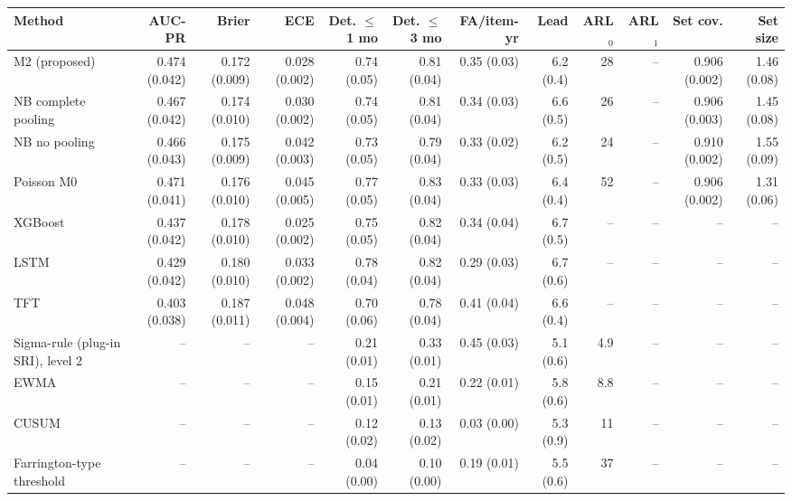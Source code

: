 \documentclass[10pt,a4paper]{article}
\begin{document}
\clearpage
\begin{landscape}
\noindent\begin{minipage}{\linewidth}
\label{tab:S2-stable}
\centering\scriptsize
\begin{tabular}{lrrrrrrrrrrr}
\toprule
Method & AUC-PR & Brier & ECE & Det. $\le$1 mo & Det. $\le$3 mo & FA/item-yr & Lead & ARL$_0$ & ARL$_1$ & Set cov. & Set size \\ \midrule
M2 (proposed) & 0.474 (0.042) & 0.172 (0.009) & 0.028 (0.002) & 0.74 (0.05) & 0.81 (0.04) & 0.35 (0.03) & 6.2 (0.4) & 28 & – & 0.906 (0.002) & 1.46 (0.08) \\
NB complete pooling & 0.467 (0.042) & 0.174 (0.010) & 0.030 (0.002) & 0.74 (0.05) & 0.81 (0.04) & 0.34 (0.03) & 6.6 (0.5) & 26 & – & 0.906 (0.003) & 1.45 (0.08) \\
NB no pooling & 0.466 (0.043) & 0.175 (0.009) & 0.042 (0.003) & 0.73 (0.05) & 0.79 (0.04) & 0.33 (0.02) & 6.2 (0.5) & 24 & – & 0.910 (0.002) & 1.55 (0.09) \\
Poisson M0 & 0.471 (0.041) & 0.176 (0.010) & 0.045 (0.005) & 0.77 (0.05) & 0.83 (0.04) & 0.33 (0.03) & 6.4 (0.4) & 52 & – & 0.906 (0.002) & 1.31 (0.06) \\
XGBoost & 0.437 (0.042) & 0.178 (0.010) & 0.025 (0.002) & 0.75 (0.05) & 0.82 (0.04) & 0.34 (0.04) & 6.7 (0.5) & – & – & – & – \\
LSTM & 0.429 (0.042) & 0.180 (0.010) & 0.033 (0.002) & 0.78 (0.04) & 0.82 (0.04) & 0.29 (0.03) & 6.7 (0.6) & – & – & – & – \\
TFT & 0.403 (0.038) & 0.187 (0.011) & 0.048 (0.004) & 0.70 (0.06) & 0.78 (0.04) & 0.41 (0.04) & 6.6 (0.4) & – & – & – & – \\
Sigma-rule (plug-in SRI), level 2 & – & – & – & 0.21 (0.01) & 0.33 (0.01) & 0.45 (0.03) & 5.1 (0.6) & 4.9 & – & – & – \\
EWMA & – & – & – & 0.15 (0.01) & 0.21 (0.01) & 0.22 (0.01) & 5.8 (0.6) & 8.8 & – & – & – \\
CUSUM & – & – & – & 0.12 (0.02) & 0.13 (0.02) & 0.03 (0.00) & 5.3 (0.9) & 11 & – & – & – \\
Farrington-type threshold & – & – & – & 0.04 (0.00) & 0.10 (0.00) & 0.19 (0.01) & 5.5 (0.6) & 37 & – & – & – \\
\bottomrule
\end{tabular}
\par\vspace{3pt}{\scriptsize In the stable cells the whole monitoring span (82 decision months) is a stable window and no change occurs, so ARL$_1$ is undefined; the detection and false-alarm columns refer to the shocks and stable windows of these cells.}
\end{minipage}
\vspace{22pt}
\end{landscape}
\end{document}
